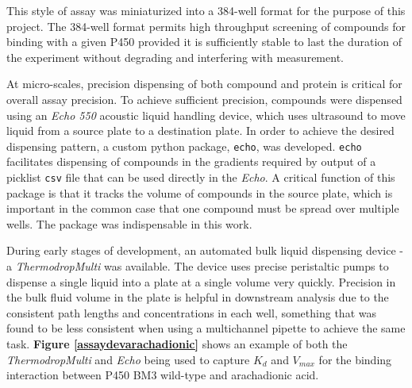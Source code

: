 \documentclass{article}
\begin{document}
This style of assay was miniaturized into a 384-well format for the purpose of this project.
The 384-well format permits high throughput screening of compounds for binding with a given P450 provided it is sufficiently stable to last the duration of the experiment without degrading and interfering with measurement.

At micro-scales, precision dispensing of both compound and protein is critical for overall assay precision.
To achieve sufficient precision, compounds were dispensed using an \textit{Echo 550} acoustic liquid handling device, which uses ultrasound to move liquid from a source plate to a destination plate.
In order to achieve the desired dispensing pattern, a custom python package, \texttt{echo}, was developed.
\texttt{echo} facilitates dispensing of compounds in the gradients required by output of a picklist \texttt{csv} file that can be used directly in the \textit{Echo}.
A critical function of this package is that it tracks the volume of compounds in the source plate, which is important in the common case that one compound must be spread over multiple wells.
The package was indispensable in this work.


During early stages of development, an automated bulk liquid dispensing device - a \textit{ThermodropMulti} was available.
The device uses precise peristaltic pumps to dispense a single liquid into a plate at a single volume very quickly.
Precision in the bulk fluid volume in the plate is helpful in downstream analysis due to the consistent path lengths and concentrations in each well, something that was found to be less consistent when using a multichannel pipette to achieve the same task.
\textbf{Figure \ref{assaydevarachadionic}} shows an example of both the \textit{ThermodropMulti} and \textit{Echo} being used to capture $K_d$ and $V_{max}$ for the binding interaction between P450 BM3 wild-type and arachadionic acid.
\end{document}
